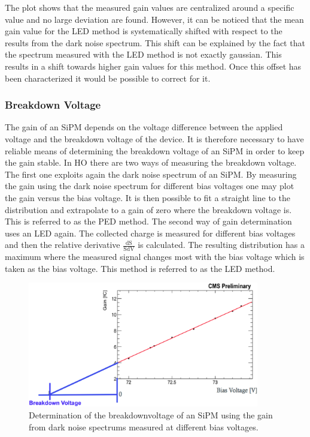 The plot shows that the measured gain values are centralized around a specific value and no large deviation are found. However, it can be noticed that the mean gain value for the LED method is systematically shifted with respect to the results from the dark noise spectrum. This shift can be explained by the fact that the spectrum measured with the LED method is not exactly gaussian. This results in a shift towards higher gain values for this method. Once this offset has been characterized it would be possible to correct for it.

\subsubsection{Breakdown Voltage}
The gain of an SiPM depends on the voltage difference between the applied voltage and the breakdown voltage of the device. It is therefore necessary to have reliable means of determining the breakdown voltage of an SiPM in order to keep the gain stable. In HO there are two ways of measuring the breakdown voltage. The first one exploits again the dark noise spectrum of an SiPM. By measuring the gain using the dark noise spectrum for different bias voltages one may plot the gain versus the bias voltage. It is then possible to fit a straight line to the distribution and extrapolate to a gain of zero where the breakdown voltage is. This is referred to as the PED method. The second way of gain determination uses an LED again. The collected charge is measured for different bias voltages and then the relative derivative $\frac{\text{dS}}{\text{SdV}}$ is calculated. The resulting distribution has a maximum where the measured signal changes most with the bias voltage which is taken as the bias voltage. This method is referred to as the LED method.
\begin{figure}[bh]
\centering
\includegraphics[width=0.9\textwidth]{Figures/kuensken/bvPedDetermination.png}
\caption{Determination of the breakdownvoltage of an SiPM using the gain from dark noise spectrums measured at different bias voltages.}
\label{kuenskenbvPed}
\end{figure}
